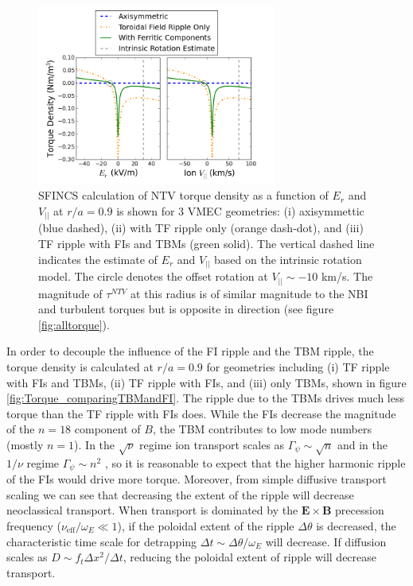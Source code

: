 \documentclass{article}
\numberwithin{figure}{section}
\numberwithin{equation}{section}
\begin{document}
\begin{figure}[h!]
\centering
\includegraphics[width=0.7\textwidth]{Torque_ErandV.png}
\caption{\label{fig:Torque_ErandV} SFINCS calculation of NTV torque density as a function of $E_r$ and $V_{||}$ at $r/a = 0.9$ is shown for 3 VMEC geometries: (i) axisymmettic (blue dashed), (ii) with TF ripple only (orange dash-dot), and (iii) TF ripple with FIs and TBMs (green solid). The vertical dashed line indicates the estimate of $E_r$ and $V_{||}$ based on the intrinsic rotation model. The circle denotes the offset rotation at $V_{||} \sim -10$ km/s. The magnitude of $\tau^{NTV}$ at this radius is of similar magnitude to the NBI and turbulent torques but is opposite in direction (see figure \ref{fig:alltorque}).}
\end{figure}

In order to decouple the influence of the FI ripple and the TBM ripple, the torque density is calculated at $r/a = 0.9$ for geometries including (i) TF ripple with FIs and TBMs, (ii) TF ripple with FIs, and (iii) only TBMs, shown in figure \ref{fig:Torque_comparingTBMandFI}. The ripple due to the TBMs drives much less torque than the TF ripple with FIs does.  While the FIs decrease the magnitude of the $n = 18$ component of $B$, the TBM contributes to low mode numbers (mostly $n = 1$). In the $\sqrt{\nu}$ regime ion transport scales as $\Gamma_{\psi} \sim \sqrt{n}$ and in the $1/\nu$ regime $\Gamma_{\psi} \sim n^2$ \cite{Shaing2010}, so it is reasonable to expect that the higher harmonic ripple of the FIs would drive more torque. Moreover, from simple diffusive transport scaling we can see that decreasing the extent of the ripple will decrease neoclassical transport. When transport is dominated by the $\bm{E} \times \bm{B}$ precession frequency ($\nu_{\text{eff}}/\omega_E \ll 1$), if the poloidal extent of the ripple $\Delta \theta$ is decreased, the characteristic time scale for detrapping $\Delta t \sim \Delta \theta/ \omega_E$ will decrease. If diffusion scales as $D \sim f_t \Delta x^2/\Delta t$, reducing the poloidal extent of ripple will decrease transport. 
\end{document}
